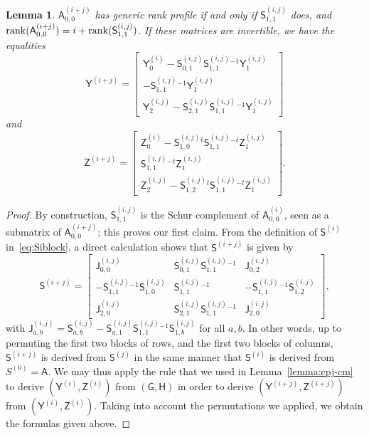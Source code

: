 \documentclass{sig-alternate}
\newcommand{\mA}{\ensuremath{\mathsf{A}}}
\newcommand{\mG}{\ensuremath{\mathsf{G}}}
\newcommand{\mH}{\ensuremath{\mathsf{H}}}
\newcommand{\mJ}{\ensuremath{\mathsf{J}}}
\newcommand{\mS}{\ensuremath{\mathsf{S}}}
\newcommand{\mY}{\ensuremath{\mathsf{Y}}}
\newcommand{\mZ}{\ensuremath{\mathsf{Z}}}
\newtheorem{lemma}[definition]{Lemma}
\begin{document}
\begin{lemma}\label{lemma:update}
  $\mA^{(i+j)}_{0,0}$ has generic rank profile if and only if
  $\mS^{(i,j)}_{1,1}$ does, and ${\rm rank}(\mA^{(i+j)}_{0,0})=i+{\rm
    rank}(\mS^{(i,j)}_{1,1})$.  If these matrices are invertible, we
  have the equalities
$$\mY^{(i+j)} =\left [ \begin{matrix}
\mY^{(i)}_0 -  \mS^{(i,j)}_{0,1} \mS^{(i,j)}_{1,1}{}^{-1} \mY^{(i,j)}_1\\[1mm]
- \mS^{(i,j)}_{1,1}{}^{-1} \mY^{(i,j)}_1\\[1mm]
\mY^{(i,j)}_2 - \mS^{(i,j)}_{2,1} \mS^{(i,j)}_{1,1}{}^{-1} \mY^{(i,j)}_1
  \end{matrix}\right ]$$
and
$$
\mZ^{(i+j)} =\left [ \begin{matrix} 
\mZ^{(i)}_0 - \mS^{(i,j)}_{1,0}{}^t \mS^{(i,j)}_{1,1}{}^{-t} \mZ^{(i,j)}_1\\[1mm]
 \mS^{(i,j)}_{1,1}{}^{-t} \mZ^{(i,j)}_1\\[1mm]
\mZ^{(i,j)}_2 - \mS^{(i,j)}_{1,2}{}^t \mS^{(i,j)}_{1,1}{}^{-t} \mZ^{(i,j)}_1
  \end{matrix}\right ].$$
\end{lemma}
\begin{proof}
  By construction, $\mS^{(i,j)}_{1,1}$ is the Schur complement of ${\mA^{(i)}_{0,0}}$,
  seen as a submatrix of $\mA^{(i+j)}_{0,0}$; this proves our first claim. From the definition of
  $\mS^{(i)}$ in~\eqref{eq:Siblock}, a direct calculation shows that $\mS^{(i+j)}$
  is given by
$$\mS^{(i+j)} = \left [ \begin{matrix} 
\mJ^{(i,j)}_{0,0} &
         \mS^{(i,j)}_{0,1}\mS^{(i,j)}_{1,1}{}^{-1} &
         \mJ^{(i,j)}_{0,2} \\
-\mS^{(i,j)}_{1,1}{}^{-1}\mS^{(i,j)}_{1,0} & 
         \mS^{(i,j)}_{1,1}{}^{-1} &
        -\mS^{(i,j)}_{1,1}{}^{-1} \mS^{(i,j)}_{1,2}\\ 
\mJ^{(i,j)}_{2,0} &
         \mS^{(i,j)}_{2,1}\mS^{(i,j)}_{1,1}{}^{-1} & 
\mJ^{(i,j)}_{2,0} 
    \end{matrix}\right ],$$
with $\mJ^{(i,j)}_{a,b}=\mS^{(i,j)}_{a,b} -\mS^{(i,j)}_{a,1} \mS^{(i,j)}_{1,1}{}^{-1}\mS^{(i,j)}_{1,b}$
for all $a,b$.
In other words, up to permuting the first two blocks of rows, and the
first two blocks of columns, $\mS^{(i+j)}$ is derived from $\mS^{(j)}$ in
the same manner that $\mS^{(i)}$ is derived from $S^{(0)}=\mA$. We may thus apply
the rule that we used in Lemma~\ref{lemma:cpj-cm} to derive
$(\mY^{(i)},\mZ^{(i)})$ from $(\mG,\mH)$ in order to derive
$(\mY^{(i+j)},\mZ^{(i+j)})$ from $(\mY^{(i)},\mZ^{(i)})$.  Taking into account the
permutations we applied, we obtain the formulas given above.
\end{proof}
\end{document}
